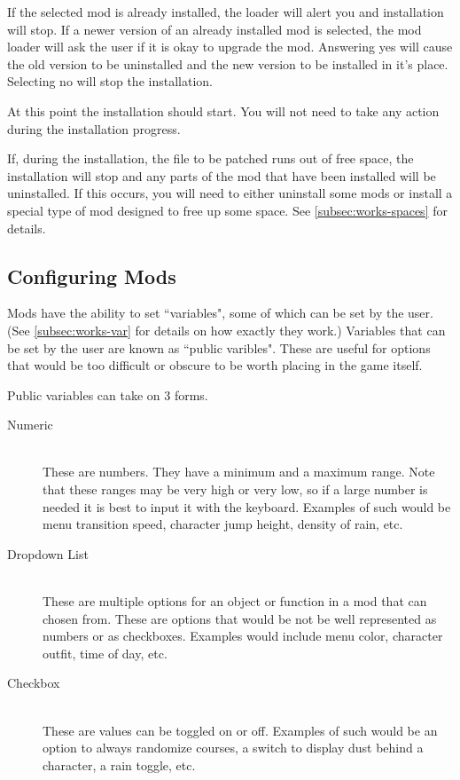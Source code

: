 \documentclass[12pt,a4paper,notitlepage]{article}
\begin{document}
If the selected mod is already installed, the loader will alert you and installation will stop. If a newer version of an already installed mod is selected, the mod loader will ask the user if it is okay to upgrade the mod. Answering yes will cause the old version to be uninstalled and the new version to be installed in it's place. Selecting no will stop the installation.

At this point the installation should start. You will not need to take any action during the installation progress.

If, during the installation, the file to be patched runs out of free space, the installation will stop and any parts of the mod that have been installed will be uninstalled. If this occurs, you will need to either uninstall some mods or install a special type of mod designed to free up some space. See \ref{subsec:works-spaces} for details.


\subsection{Configuring Mods}
\label{subsec:using-config}
Mods have the ability to set ``variables", some of which can be set by the user. (See \ref{subsec:works-var} for details on how exactly they work.) Variables that can be set by the user are known as ``public varibles". These are useful for options that would be too difficult or obscure to be worth placing in the game itself.

Public variables can take on 3 forms.

\begin{description}
\item[Numeric] \hfill \\ 
	 These are numbers. They have a minimum and a maximum range. Note that these ranges may be very high or very low, so if a large number is needed it is best to input it with the keyboard. Examples of such would be menu transition speed, character jump height, density of rain, etc. 
\item[Dropdown List] \hfill \\
	These are multiple options for an object or function in a mod that can chosen from. These are options that would be not be well represented as numbers or as checkboxes. Examples would include menu color, character outfit, time of day, etc.
\item[Checkbox] \hfill \\
	These are values can be toggled on or off. Examples of such would be an option to always randomize courses, a switch to display dust behind a character, a rain toggle, etc.
\end{description} 
\end{document}
